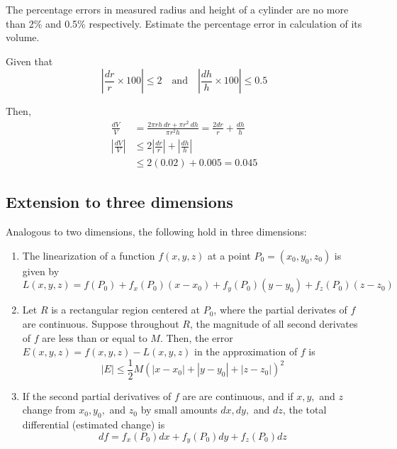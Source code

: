 \begin{example}
    \normalfont The percentage errors in measured radius and height of a cylinder are no more than 2\% and 0.5\%
    respectively. Estimate the percentage error in calculation of its volume.

    Given that
    $$\left| \frac{dr}{r} \times 100 \right| \leq 2 \ \ \ \text{ and } \ \ \
    \left| \frac{dh}{h} \times 100 \right| \leq 0.5$$

    Then,
    \begin{align*}
        \frac{dV}{V} &= \frac{2 \pi r h\ dr + \pi r^2\ dh}{\pi r^2 h} = \frac{2dr}{r} + \frac{dh}{h} \\
        \left| \frac{dV}{V} \right| &\leq 2 \left| \frac{dr}{r} \right| + \left| \frac{dh}{h} \right| \\
        &\leq 2 (0.02) + 0.005 = 0.045
    \end{align*}
\end{example}


\subsection{Extension to three dimensions}
Analogous to two dimensions, the following hold in three dimensions:

\begin{enumerate}
    \item
    The linearization of a function $f(x, y, z)$ at a point $P_0 = (x_0, y_0, z_0)$ is given by
    \begin{equation}
        L(x, y, z) = f(P_0) + f_x(P_0)(x - x_0) + f_y(P_0)(y - y_0) + f_z(P_0)(z - z_0)
    \end{equation}

    \item
    Let $R$ is a rectangular region centered at $P_0$, where the partial derivates of $f$ are continuous. Suppose throughout
    $R$, the magnitude of all second derivates of $f$ are less than or equal to $M$. Then, the error
    $E(x, y, z) = f(x, y, z) - L(x, y, z)$ in the approximation of $f$ is
    \begin{equation}
        |E| \leq \frac{1}{2}M (|x - x_0| + |y - y_0| + |z - z_0|)^2
    \end{equation}

    \item
    If the second partial derivatives of $f$ are are continuous, and if $x, y,$ and $z$ change from
    $x_0, y_0,$ and $z_0$ by small amounts $dx, dy,$ and $dz$, the total differential (estimated change) is
    \begin{equation}
        df = f_x(P_0) dx + f_y(P_0) dy + f_z(P_0) dz
    \end{equation}
\end{enumerate}